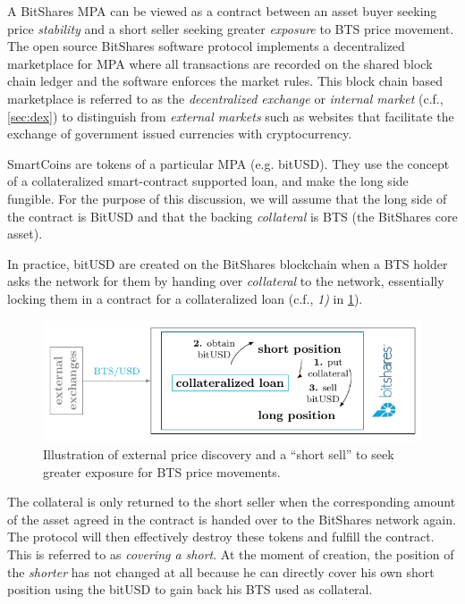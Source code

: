 \label{sec:mpa:create}

A BitShares MPA can be viewed as a contract between an asset buyer seeking
price \emph{stability} and a short seller seeking greater \emph{exposure} to
BTS price movement. The open source BitShares software protocol implements a
decentralized marketplace for MPA where all transactions are recorded on the
shared block chain ledger and the software enforces the market rules. This
block chain based marketplace is referred to as the \emph{decentralized
exchange} or \emph{internal market} (c.f., \cref{sec:dex}) to distinguish from
\emph{external markets} such as websites that facilitate the exchange of
government issued currencies with cryptocurrency.

SmartCoins are tokens of a particular MPA (e.g. bitUSD). They use the concept
of a collateralized smart-contract supported loan, and make the long side
fungible. For the purpose of this discussion, we will assume that the long side
of the contract is BitUSD and that the backing \emph{collateral} is BTS (the
BitShares core asset).

In practice, bitUSD are created on the BitShares blockchain when a BTS holder
asks the network for them by handing over \emph{collateral} to the network,
essentially locking them in a contract for a collateralized loan (c.f.,
\emph{1)} in \cref{fig:btsdex}).

\begin{figure}[!htp]
 \begin{center}
  \includegraphics[width=.8\linewidth]{figures/external-pricefeed}
 \end{center}
 \caption{Illustration of external price discovery and a ``short sell'' to seek
          greater exposure for BTS price movements.}
 \label{fig:btsdex}
\end{figure}

The collateral is only returned to the short seller when the corresponding
amount of the asset agreed in the contract is handed over to the BitShares
network again. The protocol will then effectively destroy these tokens and
fulfill the contract. This is referred to as \emph{covering a
short}. At the moment of creation, the position of the \emph{shorter} has not
changed at all because he can directly cover his own short position using the
bitUSD to gain back his BTS used as collateral.

